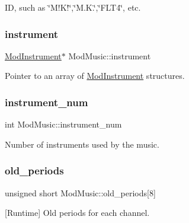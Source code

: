 ID, such as \char`\"{}\+M!\+K!\char`\"{},\char`\"{}\+M.\+K.\char`\"{},\char`\"{}\+F\+L\+T4\char`\"{}, etc. 

\mbox{\label{structModMusic_a6683f3be02e56150252cdda5caa3dc9b}} 
\subsubsection{\texorpdfstring{instrument}{instrument}}
{\footnotesize\ttfamily \hyperlink{structModInstrument}{Mod\+Instrument}$\ast$ Mod\+Music\+::instrument}



Pointer to an array of \hyperlink{structModInstrument}{Mod\+Instrument} structures. 

\mbox{\label{structModMusic_a56e199510a0f4107e0ddeb4d6f3cbd6e}} 
\subsubsection{\texorpdfstring{instrument\+\_\+num}{instrument\_num}}
{\footnotesize\ttfamily int Mod\+Music\+::instrument\+\_\+num}



Number of instruments used by the music. 

\mbox{\label{structModMusic_aaaa612da0b0920d51b87972c94e14ac0}} 
\subsubsection{\texorpdfstring{old\+\_\+periods}{old\_periods}}
{\footnotesize\ttfamily unsigned short Mod\+Music\+::old\+\_\+periods\mbox{[}8\mbox{]}}



\mbox{[}Runtime\mbox{]} Old periods for each channel. 

\mbox{\label{structModMusic_a4a05f396814c9fd4cf163fad7ea0f852}} 
